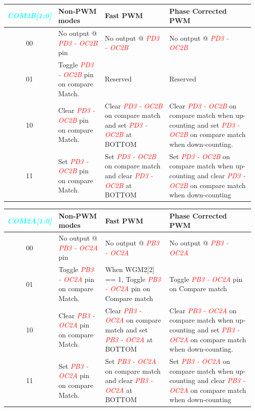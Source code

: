 \documentclass{article}
\newcommand{\bitFormat}[1]{\emph{\textbf{\textcolor{cyan}{#1}}}}
\newcommand{\pinFormat}[1]{\emph{\textcolor{red}{#1}}}
\begin{document}
\begin{table}[H]
    \begin{center}
        \begin{tabular}{c|p{4cm}|p{5.2cm}|p{5.2cm}}
            \bitFormat{COM2B[1:0]} & \textbf{Non-PWM modes} & \textbf{Fast PWM} & \textbf{Phase Corrected PWM}\\
            \hline
            00 & No output @ \pinFormat{PD3 - OC2B} pin &  No output @ \pinFormat{PD3 - OC2B} & No output @ \pinFormat{PD3 - OC2B}\\
            \hline
            01 & Toggle \pinFormat{PD3 - OC2B} pin on compare Match. & Reserved & Reserved\\
            \hline
            10 & Clear \pinFormat{PD3 - OC2B} pin on compare Match. & Clear \pinFormat{PD3 - OC2B} on compare match and  set \pinFormat{PD3 - OC2B} at BOTTOM & Clear \pinFormat{PD3 - OC2B} on compare match when up-counting and set \pinFormat{PD3 - OC2B} on compare match when down-counting.\\
            \hline
            11 & Set \pinFormat{PD3 - OC2B} pin on compare Match. & Set \pinFormat{PD3 - OC2B} on compare match and clear \pinFormat{PD3 - OC2B} at BOTTOM & Set \pinFormat{PD3 - OC2B} on compare match when up-counting and clear \pinFormat{PD3 - OC2B} on compare match when down-counting\\
        \end{tabular}
    \end{center}
\end{table}

\begin{table}[H]
    \begin{center}
        \begin{tabular}{c|p{4cm}|p{5.2cm}|p{5.2cm}}
            \bitFormat{COM2A[1:0]} & \textbf{Non-PWM modes} & \textbf{Fast PWM} & \textbf{Phase Corrected PWM}\\
            \hline
            00 & No output @ \pinFormat{PB3 - OC2A} pin &  No output @ \pinFormat{PB3 - OC2A} & No output @ \pinFormat{PB3 - OC2A}\\
            \hline
            01 & Toggle \pinFormat{PB3 - OC2A} pin on compare Match. & When WGM2[2] == 1, Toggle \pinFormat{PB3 - OC2A}  pin on Compare match & Toggle \pinFormat{PB3 - OC2A}  pin on Compare match\\
            \hline
            10 & Clear \pinFormat{PB3 - OC2A} pin on compare Match. & Clear \pinFormat{PB3 - OC2A} on compare match and  set \pinFormat{PB3 - OC2A} at BOTTOM & Clear \pinFormat{PB3 - OC2A} on compare match when up-counting and set \pinFormat{PB3 - OC2A} on compare match when down-counting.\\
            \hline
            11 & Set \pinFormat{PB3 - OC2A} pin on compare Match. & Set \pinFormat{PB3 - OC2A} on compare match and  clear \pinFormat{PB3 - OC2A} at BOTTOM & Set \pinFormat{PB3 - OC2A} on compare match when up-counting and clear \pinFormat{PB3 - OC2A} on compare match when down-counting\\
        \end{tabular}
    \end{center}
\end{table}
\end{document}
